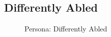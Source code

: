 \documentclass[a4paper,12pt]{report}
\begin{document}
\subsection{Differently Abled}
\begin{figure}[!htb]
	\caption{\label{fig:differently_abled}Persona: Differently Abled}	
\end{figure}

\FloatBarrier
\end{document}
